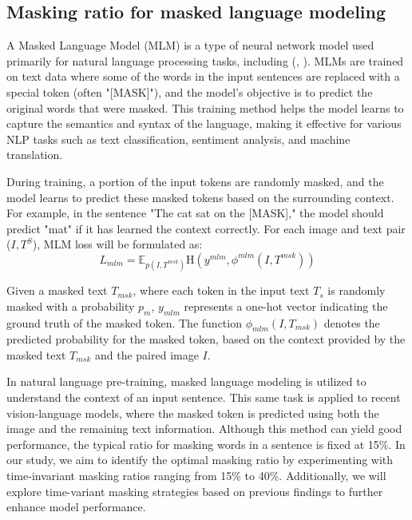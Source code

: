 \subsection{Masking ratio for masked language modeling} 
A Masked Language Model (MLM) is a type of neural network model used primarily for natural language processing tasks, including (\cite{devlin2018bert}, \cite{Bai2023RaSaRA}). MLMs are trained on text data where some of the words in the input sentences are replaced with a special token (often "[MASK]"), and the model's objective is to predict the original words that were masked. This training method helps the model learns to capture the semantics and syntax of the language, making it effective for various NLP tasks such as text classification, sentiment analysis, and machine translation.

During training, a portion of the input tokens are randomly masked, and the model learns to predict these masked tokens based on the surrounding context. For example, in the sentence "The cat sat on the [MASK]," the model should predict "mat" if it has learned the context correctly. For each image and text pair ($I,T^S$), MLM loss will be formulated as:
\[
  L_{mlm} = \mathbb{E}_{p \left( I,T^{msk}\right) }\mathrm{H}\left(y^{mlm}, \phi^{mlm}\left(I,T^{msk}\right)\right)
\]

Given a masked text \( T_{msk} \), where each token in the input text \( T_s \) is randomly masked with a probability \( p_m \), \( y_{mlm} \) represents a one-hot vector indicating the ground truth of the masked token. The function \( \phi_{mlm}(I, T_{msk}) \) denotes the predicted probability for the masked token, based on the context provided by the masked text \( T_{msk} \) and the paired image \( I \).

In natural language pre-training, masked language modeling is utilized to understand the context of an input sentence. This same task is applied to recent vision-language models, where the masked token is predicted using both the image and the remaining text information. Although this method can yield good performance, the typical ratio for masking words in a sentence is fixed at 15\%. In our study, we aim to identify the optimal masking ratio by experimenting with time-invariant masking ratios ranging from 15\% to 40\%. Additionally, we will explore time-variant masking strategies based on previous findings to further enhance model performance.


